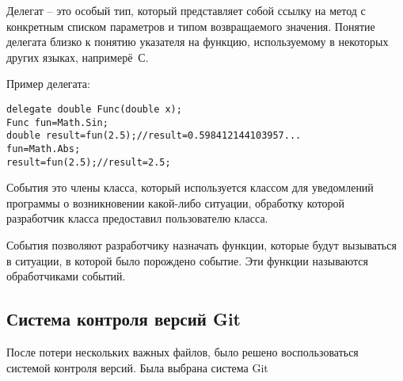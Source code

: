 \bigskip

Делегат -- это особый тип, который представляет собой ссылку на метод с конкретным списком параметров и типом возвращаемого значения. Понятие делегата близко к понятию указателя на функцию, используемому в некоторых других языках, напримерё~С. 

\noindent Пример делегата:
\begin{lstlisting}
delegate double Func(double x);
Func fun=Math.Sin;
double result=fun(2.5);//result=0.598412144103957...
fun=Math.Abs;
result=fun(2.5);//result=2.5;
\end{lstlisting}

\bigskip

События это члены класса, который используется классом для уведомлений программы о возникновении какой-либо ситуации, обработку которой разработчик класса предоставил пользователю класса.

События позволяют разработчику назначать функции, которые будут вызываться в ситуации, в которой было порождено событие. Эти функции называются обработчиками событий.


\subsection{Система контроля версий Git}
После потери нескольких важных файлов, было решено воспользоваться системой контроля версий. Была выбрана система Git 